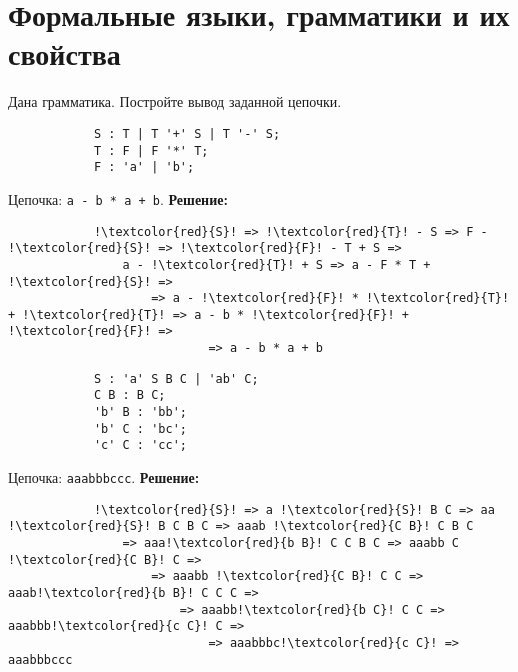 \documentclass[]{article}
\begin{document}
\section{Формальные языки, грамматики и их свойства}

\begin{enumerate}

\begin{item}
    Дана грамматика. Постройте вывод заданной цепочки.
    \begin{enumerate}
    
    \begin{item}
        \begin{lstlisting}
            S : T | T '+' S | T '-' S;
            T : F | F '*' T;
            F : 'a' | 'b';
        \end{lstlisting}
        Цепочка: \lstinline|a - b * a + b|.
        \bigbreak
        \textbf{Решение:}
        \begin{lstlisting}
            !\textcolor{red}{S}! => !\textcolor{red}{T}! - S => F - !\textcolor{red}{S}! => !\textcolor{red}{F}! - T + S =>
                a - !\textcolor{red}{T}! + S => a - F * T + !\textcolor{red}{S}! => 
                    => a - !\textcolor{red}{F}! * !\textcolor{red}{T}! + !\textcolor{red}{T}! => a - b * !\textcolor{red}{F}! + !\textcolor{red}{F}! =>
                            => a - b * a + b
        \end{lstlisting}
    \end{item}
    
    \begin{item}
        \begin{lstlisting}
            S : 'a' S B C | 'ab' C;
            C B : B C;
            'b' B : 'bb';
            'b' C : 'bc';
            'c' C : 'cc';
        \end{lstlisting}
        Цепочка: \lstinline|aaabbbccc|.
        \bigbreak
        \textbf{Решение:}
        \begin{lstlisting}
            !\textcolor{red}{S}! => a !\textcolor{red}{S}! B C => aa !\textcolor{red}{S}! B C B C => aaab !\textcolor{red}{C B}! C B C
                => aaa!\textcolor{red}{b B}! C C B C => aaabb C !\textcolor{red}{C B}! C =>
                    => aaabb !\textcolor{red}{C B}! C C => aaab!\textcolor{red}{b B}! C C C =>
                        => aaabb!\textcolor{red}{b C}! C C => aaabbb!\textcolor{red}{c C}! C =>
                            => aaabbbc!\textcolor{red}{c C}! => aaabbbccc
        \end{lstlisting}
    \end{item}
    

\end{enumerate}
\end{item}
\end{enumerate}
\end{document}
